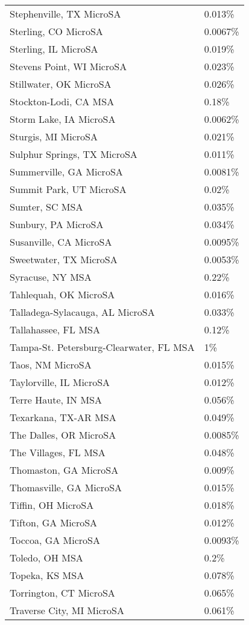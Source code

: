 \begin{longtable}[]{@{}ll@{}}
Stephenville, TX MicroSA & 0.013\% \\
Sterling, CO MicroSA & 0.0067\% \\
Sterling, IL MicroSA & 0.019\% \\
Stevens Point, WI MicroSA & 0.023\% \\
Stillwater, OK MicroSA & 0.026\% \\
Stockton-Lodi, CA MSA & 0.18\% \\
Storm Lake, IA MicroSA & 0.0062\% \\
Sturgis, MI MicroSA & 0.021\% \\
Sulphur Springs, TX MicroSA & 0.011\% \\
Summerville, GA MicroSA & 0.0081\% \\
Summit Park, UT MicroSA & 0.02\% \\
Sumter, SC MSA & 0.035\% \\
Sunbury, PA MicroSA & 0.034\% \\
Susanville, CA MicroSA & 0.0095\% \\
Sweetwater, TX MicroSA & 0.0053\% \\
Syracuse, NY MSA & 0.22\% \\
Tahlequah, OK MicroSA & 0.016\% \\
Talladega-Sylacauga, AL MicroSA & 0.033\% \\
Tallahassee, FL MSA & 0.12\% \\
Tampa-St. Petersburg-Clearwater, FL MSA & 1\% \\
Taos, NM MicroSA & 0.015\% \\
Taylorville, IL MicroSA & 0.012\% \\
Terre Haute, IN MSA & 0.056\% \\
Texarkana, TX-AR MSA & 0.049\% \\
The Dalles, OR MicroSA & 0.0085\% \\
The Villages, FL MSA & 0.048\% \\
Thomaston, GA MicroSA & 0.009\% \\
Thomasville, GA MicroSA & 0.015\% \\
Tiffin, OH MicroSA & 0.018\% \\
Tifton, GA MicroSA & 0.012\% \\
Toccoa, GA MicroSA & 0.0093\% \\
Toledo, OH MSA & 0.2\% \\
Topeka, KS MSA & 0.078\% \\
Torrington, CT MicroSA & 0.065\% \\
Traverse City, MI MicroSA & 0.061\% \\

\end{longtable}
